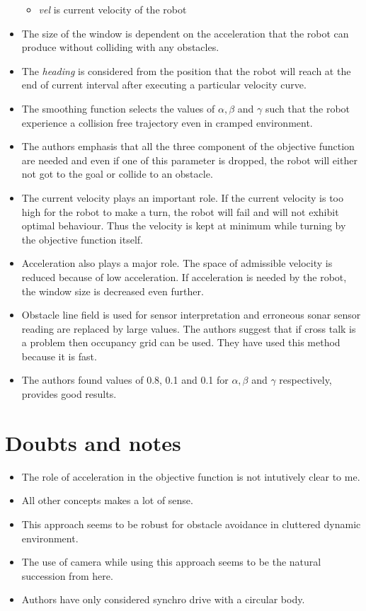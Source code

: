 \documentclass[12pt]{article}
\begin{document}
\begin{itemize}
\begin{itemize}
            \item \textit{vel} is current velocity of the robot
    \end{itemize}
    \item The size of the window is dependent on the acceleration that the robot can produce without colliding with any obstacles.
    \item The \textit{heading} is considered from the position that the robot will reach at the end of current interval after executing a particular velocity curve.
    \item The smoothing function selects the values of $\alpha, \beta$ and $\gamma$ such that the robot experience a collision free trajectory even in cramped environment.
    \item The authors emphasis that all the three component of the objective function are needed and even if one of this parameter is dropped, the robot will either not got to the goal or collide to an obstacle.
    \item The current velocity plays an important role. If the current velocity is too high for the robot to make a turn, the robot will fail and will not exhibit optimal behaviour. Thus the velocity is kept at minimum while turning by the objective function itself.
    \item Acceleration also plays a major role. The space of admissible velocity is reduced because of low acceleration. If acceleration is needed by the robot, the window size is decreased even further.
    \item Obstacle line field is used for sensor interpretation and erroneous sonar sensor reading are replaced by large values. The authors suggest that if cross talk is a problem then occupancy grid can be used. They have used this method because it is fast.
    \item The authors found values of 0.8, 0.1 and 0.1 for $\alpha, \beta$ and $\gamma$ respectively, provides good results.

\end{itemize}

\section{Doubts and notes}%
\label{sec:doubts_and_notes}
\begin{itemize}
        \item The role of acceleration in the objective function is not intutively clear to me.
        \item All other concepts makes a lot of sense.
        \item This approach seems to be robust for obstacle avoidance in cluttered dynamic environment.
        \item The use of camera while using this approach seems to be the natural succession from here.
        \item Authors have only considered synchro drive with a circular body.
\end{itemize}
\end{document}
